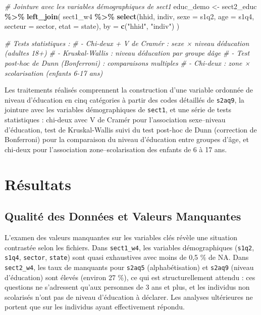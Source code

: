 \documentclass[
  11pt,
]{article}
\newenvironment{Shaded}{\begin{snugshade}}{\end{snugshade}}
\newcommand{\AttributeTok}[1]{\textcolor[rgb]{0.13,0.29,0.53}{#1}}
\newcommand{\CommentTok}[1]{\textcolor[rgb]{0.56,0.35,0.01}{\textit{#1}}}
\newcommand{\FunctionTok}[1]{\textcolor[rgb]{0.13,0.29,0.53}{\textbf{#1}}}
\newcommand{\NormalTok}[1]{#1}
\newcommand{\OtherTok}[1]{\textcolor[rgb]{0.56,0.35,0.01}{#1}}
\newcommand{\SpecialCharTok}[1]{\textcolor[rgb]{0.81,0.36,0.00}{\textbf{#1}}}
\newcommand{\StringTok}[1]{\textcolor[rgb]{0.31,0.60,0.02}{#1}}
\begin{document}
\begin{Shaded}
\begin{Highlighting}[]
\CommentTok{\# Jointure avec les variables démographiques de sect1}
\NormalTok{educ\_demo }\OtherTok{\textless{}{-}}\NormalTok{ sect2\_educ }\SpecialCharTok{\%\textgreater{}\%}
  \FunctionTok{left\_join}\NormalTok{(}
\NormalTok{    sect1\_w4 }\SpecialCharTok{\%\textgreater{}\%} \FunctionTok{select}\NormalTok{(hhid, indiv, }\AttributeTok{sexe =}\NormalTok{ s1q2,}
                        \AttributeTok{age =}\NormalTok{ s1q4, }\AttributeTok{secteur =}\NormalTok{ sector, }\AttributeTok{etat =}\NormalTok{ state),}
    \AttributeTok{by =} \FunctionTok{c}\NormalTok{(}\StringTok{"hhid"}\NormalTok{, }\StringTok{"indiv"}\NormalTok{)}
\NormalTok{  )}

\CommentTok{\# Tests statistiques :}
\CommentTok{\#   {-} Chi{-}deux + V de Cramér : sexe × niveau d\textquotesingle{}éducation (adultes 18+)}
\CommentTok{\#   {-} Kruskal{-}Wallis : niveau d\textquotesingle{}éducation par groupe d\textquotesingle{}âge}
\CommentTok{\#   {-} Test post{-}hoc de Dunn (Bonferroni) : comparaisons multiples}
\CommentTok{\#   {-} Chi{-}deux : zone × scolarisation (enfants 6{-}17 ans)}
\end{Highlighting}
\end{Shaded}

Les traitements réalisés comprennent la construction d'une variable
ordonnée de niveau d'éducation en cinq catégories à partir des codes
détaillés de \texttt{s2aq9}, la jointure avec les variables
démographiques de \texttt{sect1}, et une série de tests statistiques :
chi-deux avec V de Cramér pour l'association sexe--niveau d'éducation,
test de Kruskal-Wallis suivi du test post-hoc de Dunn (correction de
Bonferroni) pour la comparaison du niveau d'éducation entre groupes
d'âge, et chi-deux pour l'association zone--scolarisation des enfants de
6 à 17 ans.

\section{Résultats}\label{ruxe9sultats}

\subsection{Qualité des Données et Valeurs
Manquantes}\label{qualituxe9-des-donnuxe9es-et-valeurs-manquantes}

L'examen des valeurs manquantes sur les variables clés révèle une
situation contrastée selon les fichiers. Dans \texttt{sect1\_w4}, les
variables démographiques (\texttt{s1q2}, \texttt{s1q4}, \texttt{sector},
\texttt{state}) sont quasi exhaustives avec moins de 0,5 \% de NA. Dans
\texttt{sect2\_w4}, les taux de manquants pour \texttt{s2aq5}
(alphabétisation) et \texttt{s2aq9} (niveau d'éducation) sont élevés
(environ 27 \%), ce qui est structurellement attendu : ces questions ne
s'adressent qu'aux personnes de 3 ans et plus, et les individus non
scolarisés n'ont pas de niveau d'éducation à déclarer. Les analyses
ultérieures ne portent que sur les individus ayant effectivement
répondu.
\end{document}

